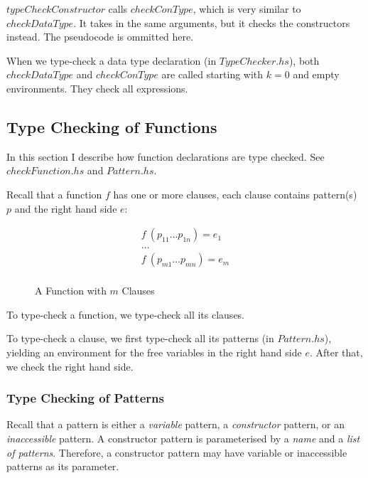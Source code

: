 \documentclass[acmsmall]{acmart}
\begin{document}
$typeCheckConstructor$ calls $checkConType$, which is very similar to $checkDataType$. It takes in the same arguments, but it checks the constructors instead. The pseudocode is ommitted here.

When we type-check a data type declaration (in $TypeChecker.hs$), both $checkDataType$ and $checkConType$ are called starting with $k=0$ and empty environments. They check all expressions.

\subsection{Type Checking of Functions}

In this section I describe how function declarations are type checked. See \emph{$checkFunction.hs$} and \emph{$Pattern.hs$}.

Recall that a function $f$ has one or more clauses, each clause contains pattern(s) $p$ and the right hand side $e$:

\begin{figure}[H]
  \begin{equation*}
    \begin{aligned}
      f \: (p_{11} \dots p_{1n}) = e_1 \\
      \dots                            \\
      f \: (p_{m1} \dots p_{mn}) = e_m \\
    \end{aligned}
  \end{equation*}
  \caption{A Function with $m$ Clauses}
\end{figure}

To type-check a function, we type-check all its clauses. 

To type-check a clause, we first type-check all its patterns (in $Pattern.hs$), yielding an environment for the free variables in the right hand side $e$. After that, we check the right hand side.

\subsubsection{Type Checking of Patterns}
\label{sec:typeCheckPattern}

Recall that a pattern is either a \emph{variable} pattern, a \emph{constructor} pattern, or an \emph{inaccessible} pattern. A constructor pattern is parameterised by a \emph{name} and a \emph{list of patterns}. Therefore, a constructor pattern may have variable or inaccessible patterns as its parameter. 
\end{document}
